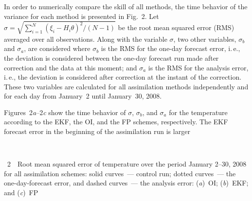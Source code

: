 \begin{multicols}{2}
In order to numerically compare the skill of all methods, the time behavior of the variance 
for each method is presented in Fig.~2. Let $\sigma =\sqrt{{\sum\limits_{i=1}^{N}(\xi_{i} -H_{i} 
\theta )^{2}  }/({N-1}) } $ be the root mean squared error (RMS) averaged over
 all observations. Along with the variable $\sigma$, two other variables, $\sigma_{b}$ 
and $\sigma_{a}$, are considered where $\sigma_{b}$ is the RMS for the one-day forecast error, i.\,e., 
the deviation is considered between the one-day forecast run made after correction and 
the data at this moment; and $\sigma_{a} $ is the RMS for the analysis error, i.\,e., 
the deviation is considered after correction at the instant of the correction. 
These two variables are calculated for all assimilation methods independently 
and for each day from January~2 until January~30, 2008.

Figures~2\textit{a}--2\textit{c} show the time behavior of $\sigma $, 
$\sigma_{b}$, and $\sigma _{a}$ for the temperature according to the EKF, the 
OI, and the FP schemes, respectively. The EKF forecast error in the beginning 
of the assimilation run is larger\linebreak\vspace*{-12pt}


\vspace*{2pt}
\begin{center}  %
\mbox{%
 \epsfxsize=77.784mm
 }
 \end{center}
{{\figurename~2}\ \ \small{Root mean squared error of temperature over the period January 2--30, 2008 
  for all assimilation schemes: solid curves~--- control run;  dotted curves~--- 
  the one-day-forecast error, and dashed curves~--- the analysis error: 
  (\textit{a})~OI; (\textit{b})~EKF; and (\textit{c})~FP}}




\vspace*{12pt}

\addtocounter{figure}{1}




\end{multicols}

